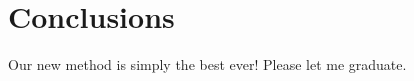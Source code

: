 
\chapter{Conclusions}\label{chap:conclusion}

Our new method is simply the best ever! Please let me graduate.

